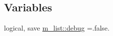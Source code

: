 \subsection*{Variables}
\begin{DoxyCompactItemize}
\item 
logical, save \mbox{\hyperlink{namespacem__list_aaa3ea916cd8c669ebbc8ec9096c5bbca}{m\+\_\+list\+::debug}} =.false.
\end{DoxyCompactItemize}
